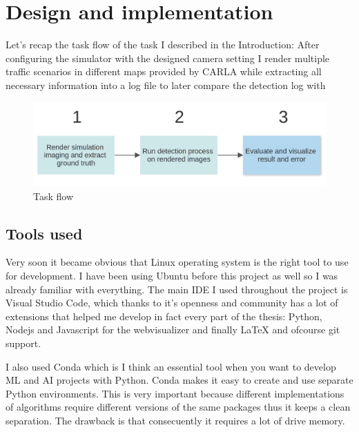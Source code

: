 \chapter{Design and implementation}
\label{chap:designimplementation}

Let's recap the task flow of the task I described in the Introduction: After
configuring the simulator with the designed camera setting I render multiple
traffic scenarios in different maps provided by CARLA while extracting all
necessary information into a log file to later compare the detection log with


\begin{figure}[!ht]
    \centering
    \includegraphics[width=150mm, keepaspectratio]{figures/flowchart.png}
    \caption{Task flow}
    \label{fig:flow2}
\end{figure}


\section{Tools used}

Very soon it became obvious that Linux operating system is the right tool to use
for development. I have been using Ubuntu before this project as well so I was
already familiar with everything. The main IDE I used throughout the project is
Visual Studio Code, which thanks to it's openness and community has a lot of
extensions that helped me develop in fact every part of the thesis: Python,
Nodejs and Javascript for the webvisualizer and finally LaTeX and ofcourse git
support.

I also used Conda which is I think an essential tool when you want to develop ML
and AI projects with Python. Conda makes it easy to create and use separate
Python environments. This is very important because different implementations of
algorithms require different versions of the same packages thus it keeps a clean
separation. The drawback is that consecuently it requires a lot of drive memory.

